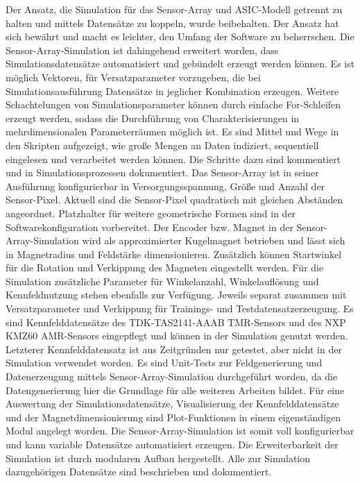 \newline
Der Ansatz, die Simulation für das Sensor-Array und ASIC-Modell getrennt zu halten und mittels Datensätze zu koppeln, wurde beibehalten. Der Ansatz hat sich bewährt und macht es leichter, den Umfang der Software zu beherrschen. Die Sensor-Array-Simulation ist dahingehend erweitert worden, dass Simulationsdatensätze automatisiert und gebündelt erzeugt werden können. Es ist möglich Vektoren, für Versatzparameter vorzugeben, die bei Simulationsausführung Datensätze in jeglicher Kombination erzeugen. Weitere Schachtelungen von Simulationsparameter können durch einfache For-Schleifen erzeugt werden, sodass die Durchführung von Charakterisierungen in mehrdimensionalen Parameterräumen möglich ist. Es sind Mittel und Wege in den Skripten aufgezeigt, wie große Mengen an Daten indiziert, sequentiell eingelesen und verarbeitet werden können. Die Schritte dazu sind kommentiert und in Simulationsprozessen dokumentiert. Das Sensor-Array ist in seiner Ausführung konfigurierbar in Versorgungsspannung, Größe und Anzahl der Sensor-Pixel. Aktuell sind die Sensor-Pixel quadratisch mit gleichen Abständen angeordnet. Platzhalter für weitere geometrische Formen sind in der Softwarekonfiguration vorbereitet. Der Encoder bzw. Magnet in der Sensor-Array-Simulation wird als approximierter Kugelmagnet betrieben und lässt sich in Magnetradius und Feldstärke dimensionieren. Zusätzlich können Startwinkel für die Rotation und Verkippung des Magneten eingestellt werden. Für die Simulation zusätzliche Parameter für Winkelanzahl, Winkelauflösung und Kennfeldnutzung stehen ebenfalls zur Verfügung. Jeweils separat zusammen mit Versatzparameter und Verkippung für Trainings- und Testdatensatzerzeugung. Es sind Kennfelddatensätze des TDK-TAS2141-AAAB TMR-Sensors und des NXP KMZ60 AMR-Sensors eingepflegt und können in der Simulation genutzt werden. Letzterer Kennfelddatensatz ist aus Zeitgründen nur getestet, aber nicht in der Simulation verwendet worden. Es sind Unit-Tests zur Feldgenerierung und Datenerzeugung mittels Sensor-Array-Simulation durchgeführt worden, da die Datengenerierung hier die Grundlage für alle weiteren Arbeiten bildet. Für eine Auswertung der Simulationsdatensätze, Visualisierung der Kennfelddatensätze und der Magnetdimensionierung sind Plot-Funktionen in einem eigenständigen Modul angelegt worden. Die Sensor-Array-Simulation ist somit voll konfigurierbar und kann variable Datensätze automatisiert erzeugen. Die Erweiterbarkeit der Simulation ist durch modularen Aufbau hergestellt. Alle zur Simulation dazugehörigen Datensätze sind beschrieben und dokumentiert.
